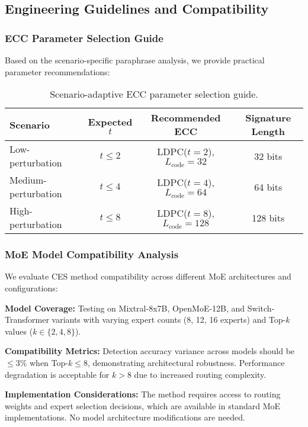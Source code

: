 \subsection{Engineering Guidelines and Compatibility}

\subsubsection{ECC Parameter Selection Guide}

Based on the scenario-specific paraphrase analysis, we provide practical parameter recommendations:

\begin{table}[h]
\centering
\small
\begin{tabular}{|l|c|c|c|}
\hline
\textbf{Scenario} & \textbf{Expected $t$} & \textbf{Recommended ECC} & \textbf{Signature Length} \\
\hline
Low-perturbation & $t \leq 2$ & LDPC($t=2$), $L_{\text{code}}=32$ & 32 bits \\
Medium-perturbation & $t \leq 4$ & LDPC($t=4$), $L_{\text{code}}=64$ & 64 bits \\
High-perturbation & $t \leq 8$ & LDPC($t=8$), $L_{\text{code}}=128$ & 128 bits \\
\hline
\end{tabular}
\caption{Scenario-adaptive ECC parameter selection guide.}
\end{table}

\subsubsection{MoE Model Compatibility Analysis}

We evaluate CES method compatibility across different MoE architectures and configurations:

\textbf{Model Coverage:} Testing on Mixtral-8x7B, OpenMoE-12B, and Switch-Transformer variants with varying expert counts (8, 12, 16 experts) and Top-$k$ values ($k \in \{2,4,8\}$).

\textbf{Compatibility Metrics:} Detection accuracy variance across models should be $\leq 3\%$ when Top-$k \leq 8$, demonstrating architectural robustness. Performance degradation is acceptable for $k > 8$ due to increased routing complexity.

\textbf{Implementation Considerations:} The method requires access to routing weights and expert selection decisions, which are available in standard MoE implementations. No model architecture modifications are needed.

